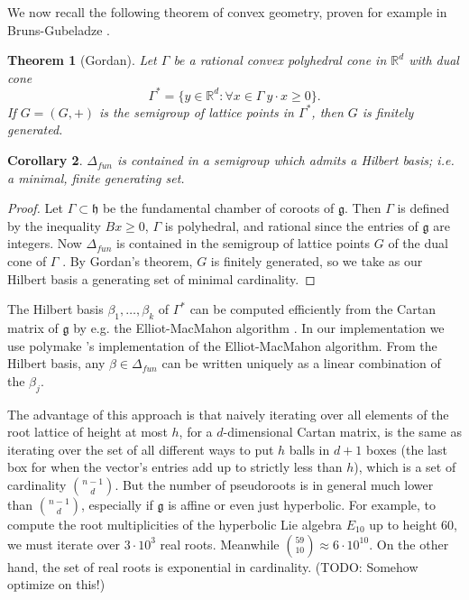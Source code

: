 \documentclass[12pt]{report}
\newcommand{\RR}{\mathbb{R}}
\newcommand{\g}{\mathfrak g}
\newcommand{\h}{\mathfrak h}
\newcommand{\dfn}[1]{\emph{#1}\index{#1}}
\newtheorem{theorem}{Theorem}[chapter]
\newtheorem{corollary}[theorem]{Corollary}
\theoremstyle{definition}
\begin{document}
We now recall the following theorem of convex geometry, proven for example in Bruns-Gubeladze \cite{bruns2009polytopes}.
\begin{theorem}[Gordan]
	Let $\Gamma$ be a rational convex polyhedral cone in $\RR^d$ with dual cone
	$$\Gamma^* = \{y \in \RR^d: \forall x \in \Gamma ~y\cdot x \geq 0\}.$$
	If $G = (G, +)$ is the semigroup of lattice points in $\Gamma^*$, then $G$ is finitely generated.
\end{theorem}
\begin{corollary}
	$\Delta_{fun}$ is contained in a semigroup which admits a \dfn{Hilbert basis}; i.e. a minimal, finite generating set.
\end{corollary}
\begin{proof}
	Let $\Gamma \subset \h$ be the fundamental chamber of coroots of $\g$. Then $\Gamma$ is defined by the inequality $Bx \geq 0$, $\Gamma$ is polyhedral, and rational since the entries of $\g$ are integers. Now $\Delta_{fun}$ is contained in the semigroup of lattice points $G$ of the dual cone of $\Gamma$ \cite[\S 5.8]{kac_2014}. By Gordan's theorem, $G$ is finitely generated, so we take as our Hilbert basis a generating set of minimal cardinality.
\end{proof}

The Hilbert basis $\beta_1, \dots, \beta_k$ of $\Gamma^*$ can be computed efficiently from the Cartan matrix of $\g$ by e.g. the Elliot-MacMahon algorithm \cite{pasechnik2001computing}. In our implementation we use polymake \cite{polymake2000}'s implementation of the Elliot-MacMahon algorithm. From the Hilbert basis, any $\beta \in \Delta_{fun}$ can be written uniquely as a linear combination of the $\beta_j$.

The advantage of this approach is that naively iterating over all elements of the root lattice of height at most $h$, for a $d$-dimensional Cartan matrix, is the same as iterating over the set of all different ways to put $h$ balls in $d + 1$ boxes (the last box for when the vector's entries add up to strictly less than $h$), which is a set of cardinality $\binom{n-1}d$. But the number of pseudoroots is in general much lower than $\binom{n-1}d$, especially if $\g$ is affine or even just hyperbolic. For example, to compute the root multiplicities of the hyperbolic Lie algebra $E_{10}$ up to height $60$, we must iterate over $3 \cdot 10^3$ real roots. Meanwhile $\binom{59}{10} \approx 6 \cdot 10^{10}$. On the other hand, the set of real roots is exponential in cardinality. (TODO: Somehow optimize on this!)
\end{document}
